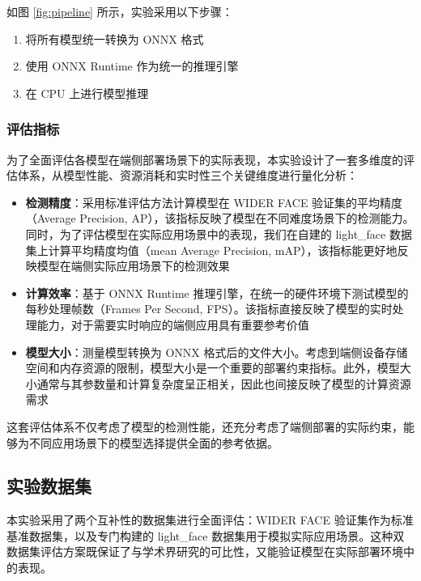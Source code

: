 \documentclass{article}
\begin{document}
如图 \ref{fig:pipeline} 所示，实验采用以下步骤：
\begin{enumerate}
    \item 将所有模型统一转换为 ONNX 格式
    \item 使用 ONNX Runtime 作为统一的推理引擎
    \item 在 CPU 上进行模型推理
\end{enumerate}

\subsubsection{评估指标}
为了全面评估各模型在端侧部署场景下的实际表现，本实验设计了一套多维度的评估体系，从模型性能、资源消耗和实时性三个关键维度进行量化分析：

\begin{itemize}
    \item \textbf{检测精度}：采用标准评估方法计算模型在 WIDER FACE 验证集的平均精度（Average Precision, AP），该指标反映了模型在不同难度场景下的检测能力。同时，为了评估模型在实际应用场景中的表现，我们在自建的 light\_face 数据集上计算平均精度均值（mean Average Precision, mAP），该指标能更好地反映模型在端侧实际应用场景下的检测效果

    \item \textbf{计算效率}：基于 ONNX Runtime 推理引擎，在统一的硬件环境下测试模型的每秒处理帧数（Frames Per Second, FPS）。该指标直接反映了模型的实时处理能力，对于需要实时响应的端侧应用具有重要参考价值

    \item \textbf{模型大小}：测量模型转换为 ONNX 格式后的文件大小。考虑到端侧设备存储空间和内存资源的限制，模型大小是一个重要的部署约束指标。此外，模型大小通常与其参数量和计算复杂度呈正相关，因此也间接反映了模型的计算资源需求
\end{itemize}

这套评估体系不仅考虑了模型的检测性能，还充分考虑了端侧部署的实际约束，能够为不同应用场景下的模型选择提供全面的参考依据。
\subsection{实验数据集}
本实验采用了两个互补性的数据集进行全面评估：WIDER FACE 验证集作为标准基准数据集，以及专门构建的 light\_face 数据集用于模拟实际应用场景。这种双数据集评估方案既保证了与学术界研究的可比性，又能验证模型在实际部署环境中的表现。
\end{document}
